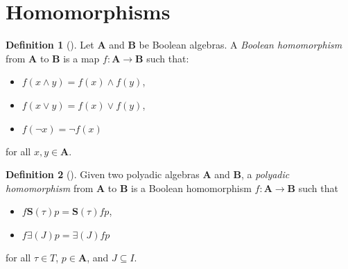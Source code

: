 \documentclass{article}
\theoremstyle{definition}
\newtheorem{definition}{Definition}
\theoremstyle{remark}
\begin{document}
\section{Homomorphisms}

\begin{definition}[\cite{givant2008introduction}]
  Let $\mathbf{A}$ and $\mathbf{B}$ be Boolean algebras. A \emph{Boolean
    homomorphism} from $\mathbf{A}$ to $\mathbf{B}$ is a map $f : \mathbf{A} \to
  \mathbf{B}$ such that:
  \begin{itemize}
  \item $f(x \land y) = f(x) \land f(y)$,
  \item $f(x \lor y) = f(x) \lor f(y)$,
  \item $f(\neg x) = \neg f(x)$
  \end{itemize}
  for all $x, y \in \mathbf{A}$.
\end{definition}

\begin{definition}[\cite{halmos2016algebraic}]
  Given two polyadic algebras $\mathbf{A}$ and $\mathbf{B}$, a \emph{polyadic
    homomorphism} from $\mathbf{A}$ to $\mathbf{B}$ is a Boolean homomorphism $f
  : \mathbf{A} \to \mathbf{B}$ such that
  \begin{itemize}
  \item $f\mathbf{S}(\tau)p = \mathbf{S}(\tau)fp$,
  \item $f\bm\exists(J)p = \bm\exists(J)fp$
  \end{itemize}
  for all $\tau \in T$, $p \in \mathbf{A}$, and $J \subseteq I$.
\end{definition}



\end{document}
